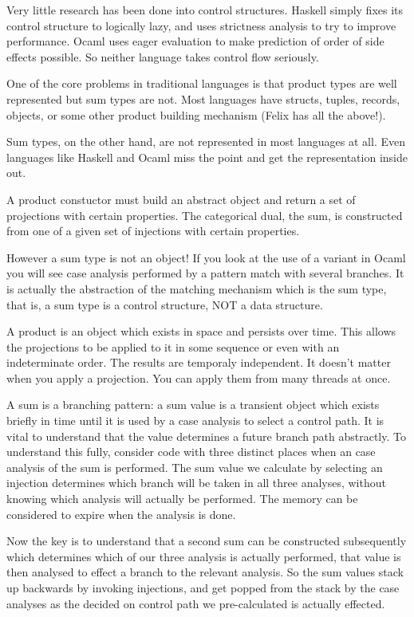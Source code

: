 \documentclass[oneside]{book}
\begin{document}
Very little research has been done into control structures.
Haskell simply fixes its control structure to logically
lazy, and uses strictness analysis to try to improve 
performance. Ocaml uses eager evaluation to make prediction
of order of side effects possible. So neither language takes
control flow seriously.

One of the core problems in traditional languages is that
product types are well represented but sum types are not.
Most languages have structs, tuples, records, objects, or some other
product building mechanism (Felix has all the above!).

Sum types, on the other hand, are not represented in most
languages at all. Even languages like Haskell and Ocaml
miss the point and get the representation inside out.

A product constuctor must build an abstract object
and return a set of projections with certain properties.
The categorical dual, the sum, is constructed from
one of a given set of injections with certain properties.

However a sum type is not an object! If you look at
the use of a variant in Ocaml you will see case analysis
performed by a pattern match with several branches.
It is actually the abstraction of the matching mechanism
which is the sum type, that is, a sum type is a control
structure, NOT a data structure.

A product is an object which exists in space and persists
over time. This allows the projections to be applied to it
in some sequence or even with an indeterminate order.
The results are temporaly independent. It doesn't matter when
you apply a projection. You can apply them from many threads
at once.

A sum is a branching pattern: a sum value is a transient
object which exists briefly in time until it is used
by a case analysis to select a control path. It is vital
to understand that the value determines a future branch
path abstractly. To understand this fully, consider code
with three distinct places when an case analysis of the sum
is performed. The sum value we calculate by selecting an
injection determines which branch will be taken in all
three analyses, without knowing which analysis will actually
be performed. The memory can be considered to expire when
the analysis is done.

Now the key is to understand that a second sum can be
constructed subsequently which determines which of our
three analysis is actually performed, that value is
then analysed to effect a branch to the relevant analysis.
So the sum values stack up backwards by invoking injections,
and get popped from the stack by the case analyses as the
decided on control path we pre-calculated is actually effected.
\end{document}
